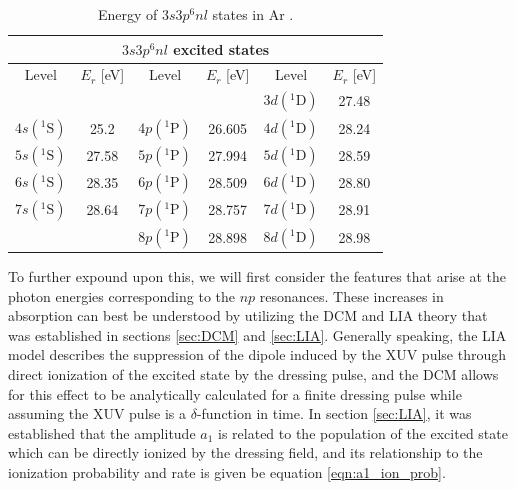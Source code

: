 \begin{table}[]
	\centering
	\begin{tabular}{|cc|cc|cc|}
		\hline \hline
		\multicolumn{6}{|c|}{$3s3p^6nl$ excited states}                                               \\ \hline
		Level        & $E_r$ {[}eV{]} & Level        & $E_r$ {[}eV{]} & Level        & $E_r$ {[}eV{]} \\ \hline
		&                &              &                & $3d({}^1\mathrm{D})$ & 27.48          \\
		$4s( {}^1\mathrm{S})$ & 25.2           & $4p({}^1\mathrm{P})$ & 26.605         & $4d({}^1\mathrm{D})$   & 28.24          \\
		$5s( {}^1\mathrm{S})$ & 27.58          & $5p({}^1\mathrm{P})$ & 27.994         & $5d({}^1\mathrm{D})$ & 28.59          \\
		$6s( {}^1\mathrm{S})$ & 28.35          & $6p({}^1\mathrm{P})$ & 28.509         & $6d( {}^1\mathrm{D})$ & 28.80          \\
		$7s( {}^1\mathrm{S})$ & 28.64          & $7p({}^1\mathrm{P})$ & 28.757         & $7d({}^1\mathrm{D})$   & 28.91          \\
		&                & $8p({}^1\mathrm{P})$ & 28.898         & $8d({}^1\mathrm{D})$ & 28.98          \\ \hline \hline
	\end{tabular}
	\caption[Energy of $3s3p^6nl$ states in Ar]{Energy of $3s3p^6nl$ states in Ar \cite{caretteMulticonfigurationalHartreeFockClosecoupling2013, brionThresholdElectronImpact1970, fryarAnalysisEjectedelectronSpectra1976, juretaEnergyAngularAnalysis2016, ogurtsovAutoIonizationStatesArgon1970, sorensenArgon3sAutoionization1994}.}
	\label{tab:all_states}
\end{table}

To further expound upon this, we will first consider the features that arise at the photon energies corresponding to the $np$ resonances.  These increases in absorption can best be understood by utilizing the DCM and LIA theory that was established in sections \ref{sec:DCM} and \ref{sec:LIA}.  Generally speaking, the LIA model describes the suppression of the dipole induced by the XUV pulse through direct ionization of the excited state by the dressing pulse, and the DCM allows for this effect to be analytically calculated for a finite dressing pulse while assuming the XUV pulse is a $\delta$-function in time.  In section \ref{sec:LIA}, it was established that the amplitude $a_1$ is related to the population of the excited state which can be directly ionized by the dressing field, and its relationship to the ionization probability and rate is given be equation \ref{eqn:a1_ion_prob}.


